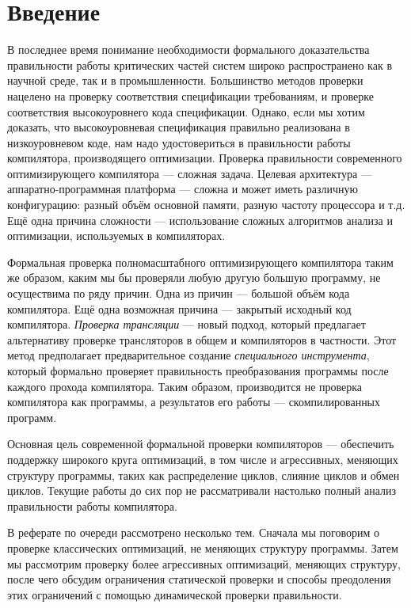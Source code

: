 \section*{Введение}
%

В последнее время понимание необходимости формального доказательства правильности работы критических частей систем широко распространено как в научной среде, так и в промышленности. Большинство методов проверки нацелено на проверку соответствия спецификации требованиям, и проверке соответствия высокоуровнего кода спецификации. Однако, если мы хотим доказать, что высокоуровневая спецификация правильно реализована в низкоуровневом коде, нам надо удостовериться в правильности работы компилятора, производящего оптимизации. Проверка правильности современного оптимизирующего компилятора --- сложная задача. Целевая архитектура --- аппаратно-программная платформа --- сложна и может иметь различную конфигурацию: разный объём основной памяти, разную частоту процессора и т.д. Ещё одна причина сложности --- использование сложных алгоритмов анализа и оптимизации, используемых в компиляторах.

Формальная проверка полномасштабного оптимизирующего компилятора таким же образом, каким мы бы проверяли любую другую большую программу, не осуществима по ряду причин. Одна из причин --- большой объём кода компилятора. Ещё одна возможная причина --- закрытый исходный код компилятора. \emph{Проверка трансляции} --- новый подход, который предлагает альтернативу проверке трансляторов в общем и компиляторов в частности. Этот метод предполагает предварительное создание \emph{специального инструмента}, который формально проверяет правильность преобразования программы после каждого прохода компилятора. Таким образом, производится не проверка компилятора как программы, а результатов его работы --- скомпилированных программ.

Основная цель современной формальной проверки компиляторов --- обеспечить поддержку широкого круга оптимизаций, в том числе и агрессивных, меняющих структуру программы, таких как распределение циклов, слияние циклов и обмен циклов. Текущие работы \cite{PSS98a,Nec00,RM00,ZPFG02} до сих пор не рассматривали настолько полный анализ правильности работы компилятора.

В реферате по очереди рассмотрено несколько тем. Сначала мы поговорим о проверке классических оптимизаций, не меняющих структуру программы. Затем мы рассмотрим проверку более агрессивных оптимизаций, меняющих структуру, после чего обсудим ограничения статической проверки и способы преодоления этих ограничений с помощью динамической проверки правильности.